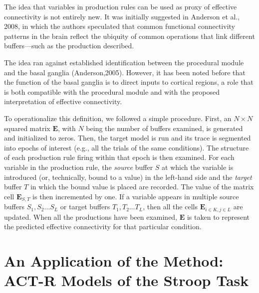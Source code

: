 \documentclass[10pt,letterpaper]{article}
\newcommand{\mat}[1]{\boldsymbol{#1}} %
\begin{document}
The idea that variables in production rules can be used as proxy of effective connectivity is not entirely new. It was initially suggested in Anderson et al., 2008, in which the authors speculated that common functional connectivity patterns in the brain reflect the ubiquity of common operations that link different buffers---such as the production described.

The idea ran against established identification between the procedural module and the basal ganglia (Anderson,2005). However, it has been noted before that the function of the basal ganglia is to direct inputs to cortical regions, a role that is both compatible with the procedural module and with the proposed interpretation of effective connectivity.

To operationalize this definition, we followed a simple procedure. First, an $N \times N$ squared matrix ${\mat{E}}$, with $N$ being the number of buffers examined, is generated and initialized to zeros. Then, the target model is run and its trace is segmented into epochs of interest  (e.g., all the trials of the same conditions). The structure of each production rule firing within that epoch is then examined. For each variable in the production rule, the {\it source} buffer $S$ at which the variable is introduced (or, technically, bound to a value) in the left-hand side and the {\it target} buffer $T$ in which the bound value is placed are recorded. The value of the matrix cell $\mat{E}_{S,T}$ is then incremented by one. If a variable appears in multiple source buffers $S_1, S_2 \dots S_L$ or target buffers $T_1, T_2 \dots T_L$, then all the cells $\mat{E}_{i \in K, j \in  L}$ are updated. When all the productions have been examined, $\mat{E}$ is taken to represent the predicted effective connectivity for that particular condition. 


\section{An Application of the Method: \\ ACT-R Models of the Stroop Task}
\end{document}
